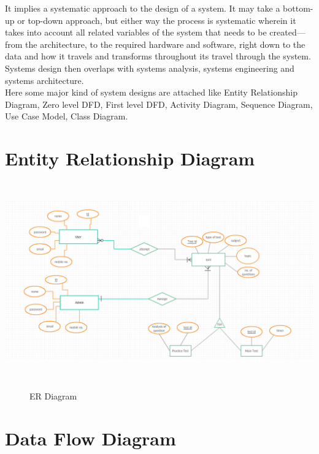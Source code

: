 It  implies a systematic approach to the design of a system. It may take a bottom-up or top-down approach, but either way the process is systematic wherein it takes into account all related variables of the system that needs to be created—from the architecture, to the required hardware and software, right down to the data and how it travels and transforms throughout its travel through the system. Systems design then overlaps with systems analysis, systems engineering and systems architecture.\\

Here some major kind of system designs are attached like Entity Relationship Diagram, Zero level DFD, First level DFD, Activity Diagram, Sequence Diagram, Use Case Model, Class Diagram.
\section{Entity Relationship Diagram}
\begin{center}
	\includegraphics[width=13.5cm,
	height=8.5cm]{E-R_Diagram.png}
	\begin{figure}[h!]
		\centering
		\caption{ER Diagram}%
	\end{figure}
\end{center}
\section{Data Flow Diagram}
